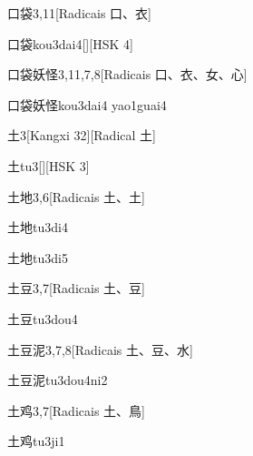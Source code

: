 \begin{entry}{口袋}{3,11}[Radicais ⼝、⾐]
  \begin{phonetics}{口袋}{kou3dai4}[][HSK 4]
  \end{phonetics}
\end{entry}

\begin{entry}{口袋妖怪}{3,11,7,8}[Radicais ⼝、⾐、⼥、⼼]
  \begin{phonetics}{口袋妖怪}{kou3dai4 yao1guai4}
  \end{phonetics}
\end{entry}

\begin{entry}{土}{3}[Kangxi 32][Radical ⼟]
  \begin{phonetics}{土}{tu3}[][HSK 3]
  \end{phonetics}
\end{entry}

\begin{entry}{土地}{3,6}[Radicais ⼟、⼟]
  \begin{phonetics}{土地}{tu3di4}
  \end{phonetics}
  \begin{phonetics}{土地}{tu3di5}
  \end{phonetics}
\end{entry}

\begin{entry}{土豆}{3,7}[Radicais ⼟、⾖]
  \begin{phonetics}{土豆}{tu3dou4}
  \end{phonetics}
\end{entry}

\begin{entry}{土豆泥}{3,7,8}[Radicais ⼟、⾖、⽔]
  \begin{phonetics}{土豆泥}{tu3dou4ni2}
  \end{phonetics}
\end{entry}

\begin{entry}{土鸡}{3,7}[Radicais ⼟、⿃]
  \begin{phonetics}{土鸡}{tu3ji1}
  \end{phonetics}
\end{entry}

